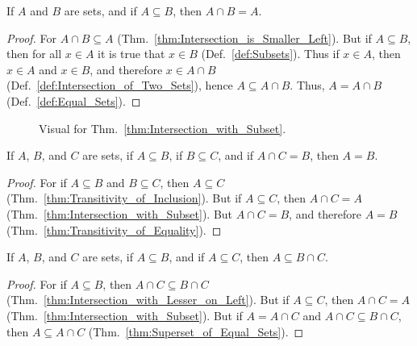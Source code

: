         \begin{theorem}
            \label{thm:Intersection_with_Subset}%
            If $A$ and $B$ are sets, and if $A\subseteq{B}$, then $A\cap{B}=A$.
        \end{theorem}
        \begin{proof}
            For $A\cap{B}\subseteq{A}$
            (Thm.~\ref{thm:Intersection_is_Smaller_Left}). But if
            $A\subseteq{B}$, then for all $x\in{A}$ it is true that $x\in{B}$
            (Def.~\ref{def:Subsets}). Thus if $x\in{A}$, then $x\in{A}$ and
            $x\in{B}$, and therefore $x\in{A}\cap{B}$
            (Def.~\ref{def:Intersection_of_Two_Sets}), hence
            $A\subseteq{A}\cap{B}$. Thus, $A=A\cap{B}$
            (Def.~\ref{def:Equal_Sets}).
        \end{proof}
        \begin{figure}[H]
            \centering
            \captionsetup{type=figure}
            \centering
            
            \caption{Visual for Thm.~\ref{thm:Intersection_with_Subset}.}
            \label{fig:Intersection_with_Subset}
        \end{figure}
        \begin{theorem}
            \label{thm:A_sub_B_sub_C_and_A_cap_C_eq_B}%
            If $A$, $B$, and $C$ are sets, if $A\subseteq{B}$, if
            $B\subseteq{C}$, and if $A\cap{C}=B$, then $A=B$.
        \end{theorem}
        \begin{proof}
            For if $A\subseteq{B}$ and $B\subseteq{C}$, then $A\subseteq{C}$
            (Thm.~\ref{thm:Transitivity_of_Inclusion}). But if $A\subseteq{C}$,
            then $A\cap{C}=A$ (Thm.~\ref{thm:Intersection_with_Subset}). But
            $A\cap{C}=B$, and therefore $A=B$
            (Thm.~\ref{thm:Transitivity_of_Equality}).
        \end{proof}
        \begin{theorem}
            \label{thm:Intersection_of_Supersets_is_Still_Superset}%
            If $A$, $B$, and $C$ are sets, if $A\subseteq{B}$, and if
            $A\subseteq{C}$, then $A\subseteq{B}\cap{C}$.
        \end{theorem}
        \begin{proof}
            For if $A\subseteq{B}$, then $A\cap{C}\subseteq{B}\cap{C}$
            (Thm.~\ref{thm:Intersection_with_Lesser_on_Left}). But if
            $A\subseteq{C}$, then $A\cap{C}=A$
            (Thm.~\ref{thm:Intersection_with_Subset}). But if $A=A\cap{C}$
            and $A\cap{C}\subseteq{B}\cap{C}$, then $A\subseteq{A}\cap{C}$
            (Thm.~\ref{thm:Superset_of_Equal_Sets}).
        \end{proof}
